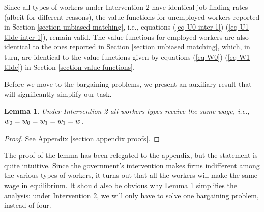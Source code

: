 \documentclass[12pt]{article} %
\newtheorem{lemma}[theorem]{Lemma}
\theoremstyle{definition}
\begin{document}
Since all types of workers under Intervention 2 have identical job-finding rates (albeit for different reasons), the value functions for unemployed workers reported in Section \ref{section unbiased matching}, i.e., equations (\ref{eq U0 inter 1})-(\ref{eq U1 tilde inter 1}), remain valid. 
The value functions for employed workers are also identical to the ones reported in Section \ref{section unbiased matching}, which, in turn, are identical to the value functions given by equations (\ref{eq W0})-(\ref{eq W1 tilde}) in Section \ref{section value functions}. 

Before we move to the bargaining problems, we present an auxiliary result that will significantly simplify our task.

\begin{lemma}\label{lemma all ws the same}
Under Intervention 2 all workers types receive the same wage, i.e., $w_0=\Tilde{w_0}=w_1=\Tilde{w_1}=w$.     \end{lemma}
\begin{proof}
See Appendix \ref{section appendix proofs}.
\end{proof}

The proof of the lemma has been relegated to the appendix, but the statement is quite intuitive. Since the government's intervention makes firms indifferent among the various types of workers, it turns out that all the workers will make the same wage in equilibrium. It should also be obvious why Lemma \ref{lemma all ws the same} simplifies the analysis: under Intervention 2, we will only have to solve one bargaining problem, instead of four. 
\end{document}
